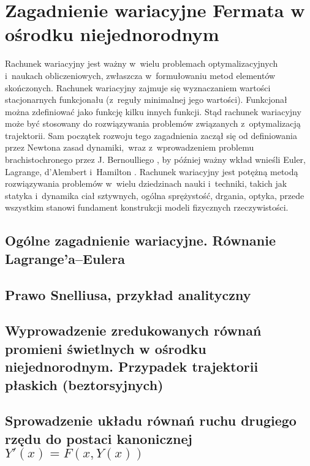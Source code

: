 \documentclass[a4paper,12pkt]{report}
\begin{document}


\chapter{Zagadnienie wariacyjne Fermata w ośrodku niejednorodnym}

\indent Rachunek wariacyjny jest ważny w~wielu problemach optymalizacyjnych i~naukach obliczeniowych, zwłaszcza w~formułowaniu metod elementów skończonych. Rachunek wariacyjny zajmuje się wyznaczaniem wartości stacjonarnych funkcjonału (z~reguły minimalnej jego wartości). 
Funkcjonał można zdefiniować jako funkcję kilku innych funkcji. Stąd rachunek wariacyjny może być stosowany do rozwiązywania problemów związanych z~optymalizacją trajektorii. Sam początek rozwoju tego zagadnienia zaczął się od definiowania przez Newtona zasad dynamiki,~wraz z~wprowadzeniem problemu brachistochronego przez J. Bernoulliego \cite{elsgolc2012calculus}, by później ważny wkład wnieśli Euler, Lagrange, d’Alembert i~Hamilton \cite{dacorogna2014introduction,goldstine2012history,giaquinta2013calculus}. Rachunek wariacyjny jest potężną metodą rozwiązywania problemów w~wielu dziedzinach nauki i~techniki, takich jak statyka i~dynamika ciał sztywnych, ogólna sprężystość, drgania, optyka, przede wszystkim stanowi fundament konstrukcji modeli fizycznych rzeczywistości.

\section{Ogólne zagadnienie wariacyjne. Równanie\\ Lagrange'a--Eulera}



\section{Prawo Snelliusa, przykład analityczny}


\newpage
\section{Wyprowadzenie zredukowanych równań promieni świe\-tlnych w ośrodku niejednorodnym. Przypadek trajektorii płaskich (beztorsyjnych)}


\section{Sprowadzenie układu równań ruchu drugiego rzędu do postaci kanonicznej $Y'(x)=F(x,Y(x))$}
\label{s:spro_ukl}

\end{document}
